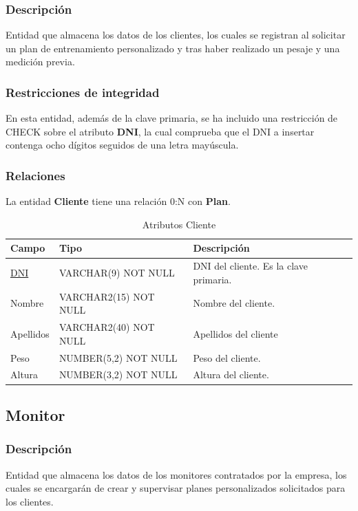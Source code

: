 \documentclass[12pt, a4paper]{article}
\begin{document}
	\subsubsection*{Descripción}
	Entidad que almacena los datos de los clientes, los cuales se registran al solicitar un plan de entrenamiento personalizado y tras haber realizado un pesaje y una medición previa.
	\subsubsection*{Restricciones de integridad}
	En esta entidad, además de la clave primaria, se ha incluido una restricción de CHECK sobre el atributo \textbf{DNI}, la cual comprueba que el DNI a insertar contenga ocho dígitos seguidos de una letra mayúscula.
	\subsubsection*{Relaciones}
	La entidad \textbf{Cliente} tiene una relación 0:N con \textbf{Plan}.
	\begin{table}[H]
		\centering
		\caption{Atributos Cliente}
		\begin{tabular}{@{} m{2.5cm} m{5.5cm} m{7cm} @{}}
			\toprule
			\textbf{Campo} & \textbf{Tipo} & \textbf{Descripción} \\ \midrule
			\underline{DNI} & VARCHAR(9) NOT NULL & DNI del cliente. Es la clave primaria. \\
			Nombre & VARCHAR2(15) NOT NULL & Nombre del cliente. \\	
			Apellidos & VARCHAR2(40) NOT NULL & Apellidos del cliente \\
			Peso & NUMBER(5,2) NOT NULL & Peso del cliente. \\	
			Altura & NUMBER(3,2) NOT NULL & Altura del cliente. \\ \bottomrule
		\end{tabular}
	\end{table}
	
	\newpage
	\subsection{Monitor}
	\subsubsection*{Descripción}
	Entidad que almacena los datos de los monitores contratados por la empresa, los cuales se encargarán de crear y supervisar planes personalizados solicitados para los clientes.
\end{document}
